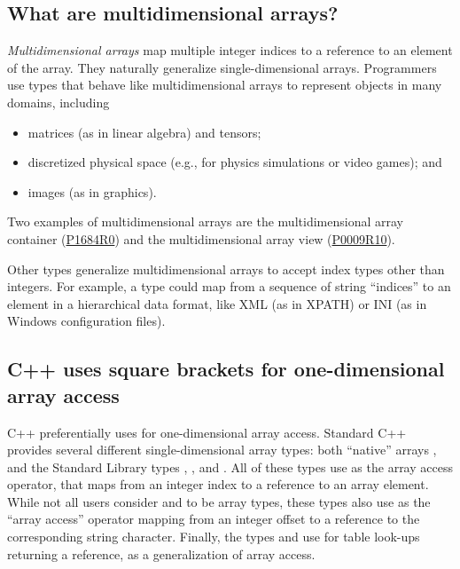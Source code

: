 \documentclass{wg21}
\begin{document}
\subsection{What are multidimensional arrays?}

\emph{Multidimensional arrays} map multiple integer indices to a reference to an element of the array.
They naturally generalize single-dimensional arrays.
Programmers use types that behave like multidimensional arrays to represent objects in many domains, including

\begin{itemize}
\item matrices (as in linear algebra) and tensors;
\item discretized physical space (e.g., for physics simulations or video games); and
\item images (as in graphics).
\end{itemize}

Two examples of multidimensional arrays are the multidimensional array container  (\href{wg21.link/p1684r0}{P1684R0})
and the multidimensional array view  (\href{wg21.link/p0009r10}{P0009R10}).

Other types generalize multidimensional arrays to accept index types other than integers.
For example, a type could map from a sequence of string ``indices'' to an element in a hierarchical data format,
like XML (as in XPATH) or INI (as in Windows configuration files).

\subsection{C++ uses square brackets for one-dimensional array access}

C++ preferentially uses  for one-dimensional array access.  Standard C++ provides several different single-dimensional array types: both ``native'' arrays , and the Standard Library types , , and .  All of these types use  as the array access operator, that maps from an integer index to a reference to an array element.  While not all users consider  and  to be array types, these types also use  as the ``array access'' operator mapping from an integer offset to a reference to the corresponding string character.  Finally, the types  and  use  for table look-ups returning a reference, as a generalization of array access.
\end{document}

